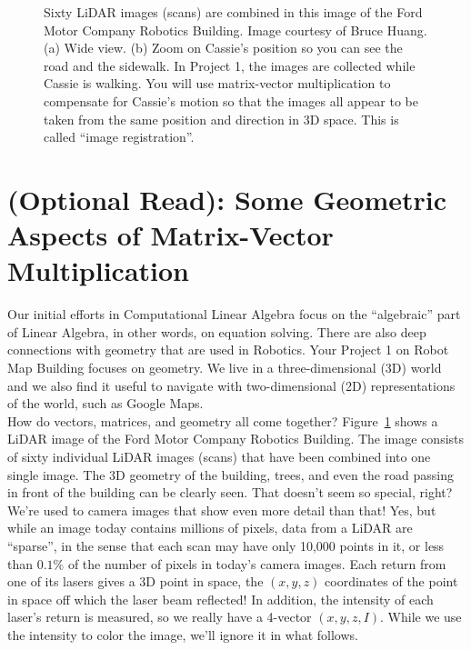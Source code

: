 \begin{figure}[hbt!]
\centering
{}%
\hspace{5pt}%
%
\caption{Sixty LiDAR images (scans) are combined in this image of the Ford Motor Company Robotics Building. Image courtesy of Bruce Huang. (a) Wide view. (b) Zoom on Cassie's position so you can see the road and the sidewalk. In Project 1, the images are collected while Cassie is walking. You will use matrix-vector multiplication to compensate for Cassie's motion so that the images all appear to be taken from the same position and direction in 3D space. This is called ``image registration''. }
    \label{fig:Chap04MatrixMultiplication/FRBlidarCassieScan}
\end{figure}

\section{(Optional Read): Some Geometric Aspects of Matrix-Vector Multiplication}

Our initial efforts in Computational Linear Algebra focus on the ``algebraic'' part of Linear Algebra, in other words, on equation solving. There are also deep connections with geometry that are used in Robotics. Your Project 1 on Robot Map Building focuses on geometry. We live in a three-dimensional (3D) world and we also find it useful to navigate with two-dimensional (2D) representations of the world, such as Google Maps. \\

How do vectors, matrices, and geometry all come together? Figure~\ref{fig:Chap04MatrixMultiplication/FRBlidarCassieScan} shows a LiDAR image of the Ford Motor Company Robotics Building. The image consists of sixty individual LiDAR images (scans) that have been combined into one single image. The 3D geometry of the building, trees, and even the road passing in front of the building can be clearly seen. That doesn't seem so special, right? We're used to camera images that show even more detail than that! Yes, but while an image today contains millions of pixels, data from a LiDAR are ``sparse'', in the sense that each scan may have only 10,000 points in it, or less than $0.1\%$ of the number of pixels in today's camera images. Each return from one of its lasers gives a 3D point in space, the $(x, y, z)$ coordinates of the point in space off which the laser beam reflected! In addition, the intensity of each laser's return is measured, so we really have a 4-vector $(x, y, z, I)$. While we use the intensity to color the image, we'll ignore it in what follows.

